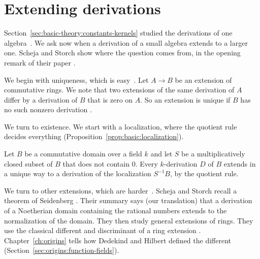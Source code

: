 \section{Extending derivations}\label{sec:basic-theory:extension}

Section~\ref{sec:basic-theory:constants-kernels} studied the derivations of
one algebra~\cite[p.~353]{SchejaStorch1978}. We ask now when a derivation of a small algebra extends to a
larger one. Scheja and Storch show where the question comes from, in the
opening remark of their paper  \cite[p.~353]{SchejaStorch1978}.

We begin with uniqueness, which is easy~\cite[\S1, p.~354]{SchejaStorch1978}. Let $A \to B$ be an extension of
commutative rings. We note that two extensions of the same derivation of $A$
differ by a derivation of $B$ that is zero on $A$. So an extension is unique
if $B$ has no such nonzero derivation \cite[\S1, p.~354]{SchejaStorch1978}.

We turn to existence. We start with a localization, where the quotient rule
decides everything (Proposition~\ref{prop:basic:localization}).

\begin{proposition}\label{prop:basic:localization}
Let $B$ be a commutative domain over a field $k$ and let $S$ be a multiplicatively closed subset of $B$ that does not contain $0$. Every $k$-derivation $D$ of $B$ extends in a unique way to a derivation of the localization $S^{-1}B$, by the quotient rule.
\end{proposition}

We turn to other extensions, which are harder~\cite[p.~353]{SchejaStorch1978}. Scheja and Storch recall a
theorem of Seidenberg \cite[p.~353]{SchejaStorch1978}. Their summary says (our
translation) that a derivation of a Noetherian domain containing the rational
numbers extends to the normalization of the domain. They then study general
extensions of rings. They use the classical different and discriminant of a
ring extension \cite[p.~353]{SchejaStorch1978}. Chapter~\ref{ch:origins} tells
how Dedekind and Hilbert defined the different
(Section~\ref{sec:origins:function-fields}).

